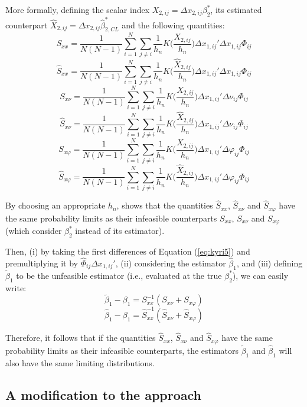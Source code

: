 More formally, defining the scalar index $X_{2,ij} = \Delta x_{2,ij} \beta_2^*$, its estimated counterpart $\hat{X}_{2,ij} = \Delta x_{2,ij} \hat{\beta}_{2,CL}^*$ and the following quantities:
$$ S_{xx} = \frac{1}{N(N-1)} \sum_{i=1}^N \sum_{j \neq i} \frac{1}{h_n} K \Big( \frac{X_{2,ij}}{h_n} \Big) \Delta x_{1,ij}'\Delta x_{1,ij} \Phi_{ij}$$
$$ \hat{S}_{xx} = \frac{1}{N(N-1)} \sum_{i=1}^N \sum_{j \neq i} \frac{1}{h_n} K \Big( \frac{\hat{X}_{2,ij}}{h_n} \Big) \Delta x_{1,ij}'\Delta x_{1,ij} \Phi_{ij}$$
$$ S_{x\nu} = \frac{1}{N(N-1)} \sum_{i=1}^N \sum_{j \neq i} \frac{1}{h_n} K \Big( \frac{X_{2,ij}}{h_n} \Big) \Delta x_{1,ij}'\Delta \nu_{ij} \Phi_{ij}$$
$$ \hat{S}_{x\nu} = \frac{1}{N(N-1)} \sum_{i=1}^N \sum_{j \neq i} \frac{1}{h_n} K \Big( \frac{\hat{X}_{2,ij}}{h_n} \Big) \Delta x_{1,ij}'\Delta \nu_{ij} \Phi_{ij}$$
$$ S_{x\varphi} = \frac{1}{N(N-1)} \sum_{i=1}^N \sum_{j \neq i} \frac{1}{h_n} K \Big( \frac{X_{2,ij}}{h_n} \Big) \Delta x_{1,ij}'\Delta \varphi_{ij} \Phi_{ij}$$
$$ \hat{S}_{x\varphi} = \frac{1}{N(N-1)} \sum_{i=1}^N \sum_{j \neq i} \frac{1}{h_n} K \Big( \frac{\hat{X}_{2,ij}}{h_n} \Big) \Delta x_{1,ij}'\Delta \varphi_{ij} \Phi_{ij}$$

By choosing an appropriate $h_n$, \cite{kyriazidou1997estimation} shows that the quantities $\hat{S}_{xx}$, $\hat{S}_{x\nu}$ and $\hat{S}_{x\varphi}$ have the same probability limits as their infeasible counterparts ${S}_{xx}$, ${S}_{x\nu}$ and ${S}_{x\varphi}$ (which consider $\beta_2^*$ instead of its estimator).

Then, (i) by taking the first differences of Equation (\ref{eq:kyri5}) and premultiplying it by $\hat{\Phi}_{ij} \Delta x_{1,ij}'$, (ii) considering the estimator $\hat{\beta}_1$, and (iii) defining $\tilde{\beta}_1$ to be the unfeasible estimator (i.e., evaluated at the true $\beta_2^*$), we can easily write:
$$ \tilde{\beta}_1 - \beta_1 = S_{xx}^{-1}(S_{x\nu} + S_{x\varphi})$$
$$ \hat{\beta}_1 - \beta_1 = \hat{S}_{xx}^{-1}(\hat{S}_{x\nu} + \hat{S}_{x\varphi})$$

Therefore, it follows that if the quantities $\hat{S}_{xx}$, $\hat{S}_{x\nu}$ and $\hat{S}_{x\varphi}$ have the same probability limits as their infeasible counterparts, the estimators $\tilde{\beta}_1$ and $\hat{\beta}_1$ will also have the same limiting distributions.

\subsection{A modification to the approach} \label{modified_kyri}

